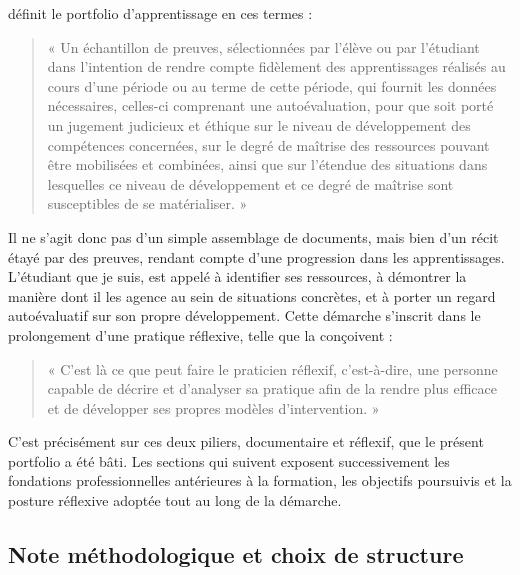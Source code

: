 \citet{tardif2006} définit le portfolio d'apprentissage en ces termes :

\begin{quote}
    « Un échantillon de preuves, sélectionnées par l'élève ou par l'étudiant dans l'intention de rendre compte fidèlement des apprentissages réalisés au cours d'une période ou au terme de cette période, qui fournit les données nécessaires, celles-ci comprenant une autoévaluation, pour que soit porté un jugement judicieux et éthique sur le niveau de développement des compétences concernées, sur le degré de maîtrise des ressources pouvant être mobilisées et combinées, ainsi que sur l'étendue des situations dans lesquelles ce niveau de développement et ce degré de maîtrise sont susceptibles de se matérialiser. » \citep[p.~266]{tardif2006}
\end{quote}

Il ne s'agit donc pas d'un simple assemblage de documents, mais bien d'un récit étayé par des preuves, rendant compte d'une progression dans les apprentissages. L'étudiant que je suis, est appelé à identifier ses ressources, à démontrer la manière dont il les agence au sein de situations concrètes, et à porter un regard autoévaluatif sur son propre développement. Cette démarche s'inscrit dans le prolongement d'une pratique réflexive, telle que la conçoivent \citet{lafortune2001} :

\begin{quote}
    « C'est là ce que peut faire le praticien réflexif, c'est-à-dire, une personne capable de décrire et d'analyser sa pratique afin de la rendre plus efficace et de développer ses propres modèles d'intervention. » \citep[p.~68]{lafortune2001}
\end{quote}

C'est précisément sur ces deux piliers, documentaire et réflexif, que le présent portfolio a été bâti. Les sections qui suivent exposent successivement les fondations professionnelles antérieures à la formation, les objectifs poursuivis et la posture réflexive adoptée tout au long de la démarche.

\subsection*{Note méthodologique et choix de structure}

